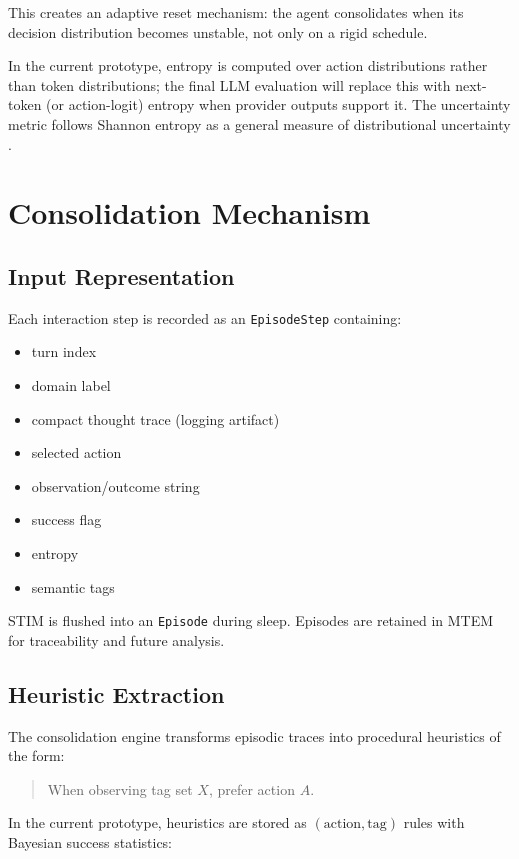 \documentclass{article}
\begin{document}
This creates an adaptive reset mechanism: the agent consolidates when its decision distribution becomes unstable, not only on a rigid schedule.

In the current prototype, entropy is computed over action distributions rather than token distributions; the final LLM evaluation will replace this with next-token (or action-logit) entropy when provider outputs support it. The uncertainty metric follows Shannon entropy as a general measure of distributional uncertainty \citep{shannon1948mathematical}.

\section{Consolidation Mechanism}

\subsection{Input Representation}

Each interaction step is recorded as an \texttt{EpisodeStep} containing:

\begin{itemize}[leftmargin=1.25em]
\item turn index
\item domain label
\item compact thought trace (logging artifact)
\item selected action
\item observation/outcome string
\item success flag
\item entropy
\item semantic tags
\end{itemize}

STIM is flushed into an \texttt{Episode} during sleep. Episodes are retained in MTEM for traceability and future analysis.

\subsection{Heuristic Extraction}

The consolidation engine transforms episodic traces into procedural heuristics of the form:

\begin{quote}
When observing tag set $X$, prefer action $A$.
\end{quote}

In the current prototype, heuristics are stored as $(\text{action}, \text{tag})$ rules with Bayesian success statistics:
\end{document}
